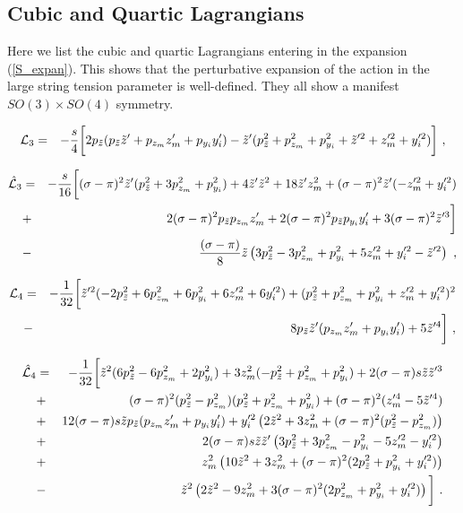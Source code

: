 \documentclass[12pt]{article}
\def\tz{\tilde{z}}
\numberwithin{equation}{section}
\begin{document}
\begin{appendices}
\section{Cubic and Quartic Lagrangians}
\label{Appx_Cubic_Quartic}

Here we list the cubic and quartic Lagrangians entering in the expansion (\ref{S_expan}).  This shows that the perturbative expansion of the action in the large string tension parameter is well-defined.  They all show a manifest $SO(3)\times SO(4)$ symmetry.

\begin{eqnarray}
\notag
\mathcal{L}_3 &=& -\frac{s}{4}\bigg[2 p_{\tz} (p_{\tz}
   \tilde{z}' +p_{z_m} z_m' + p_{y_i} y_i'
   )-\tilde{z}'
   (p_{\tz}^2+p_{z_m}^2+p_{y_i}^2+\tilde{z}'^2 + z_m'^2 + y_i'^2)\bigg] \ , \\
\end{eqnarray}


\begin{eqnarray}
\notag
\hat{\mathcal{L}}_3 &=& -\frac{s}{16}\bigg[ (\sigma-\pi)
   ^2 \tilde{z}' ( p_{\tz}^2+3 p_{z_m}^2 + p_{y_i}^2) +4\tilde{z}' \tilde{z}^2+18 \tilde{z}'z_m^2 +(\sigma-\pi)^2\tilde{z}' (-z_m'^2+y_i'^2)\\
   \notag
   &+&2(\sigma-\pi)^2 p_{\tz}p_{z_m}z_m'
  +2(\sigma-\pi)^2 p_{\tz}p_{y_i}y_i'+3(\sigma-\pi) ^2 \tilde{z}'^3\bigg] \\
 &-&\frac{(\sigma-\pi)}{8} \tilde{z} \left( 3 p_{\tz}^2-3 p_{z_m}^2+ p_{y_i}^2 + 5 z_m'^2 + y_i'^2 - \tilde{z}'^2 \right) \ ,
\end{eqnarray}


\begin{eqnarray}
\notag
\mathcal{L}_4 &=& -\frac{1}{32}\bigg[\tilde{z}'^2 (-2 p_{\tz}^2+6p_{z_m}^2 + 6p_{y_i}^2+6z_m'^2 + 6y_i'^2) +(p_{\tz}^2 + p_{z_m}^2 + p_{y_i}^2+z_m'^2 + y_i'^2)^2\\
   &-&8 p_{\tz}\tilde{z}' (p_{z_m}z_m'+p_{y_i}y_i')+5\tilde{z}'^4 \bigg] \ , 
\end{eqnarray}


\begin{eqnarray}
\notag
\hat{\mathcal{L}}_4 &=&-\frac{1}{32}\bigg[ \tz^2( 6 p_{\tz}^2  - 6 p_{z_m}^2 + 2 p_{y_i}^2) + 3 z_{m}^2 (-p_{\tz}^2 + p_{z_m}^2 + p_{y_i}^2) + 2 (\sigma-\pi) s \tz \tz'^3 \\
\notag
&+& (\sigma-\pi)^2 (p_{\tz}^2 - p_{z_m}^2)(p_{\tz}^2 + p_{z_m}^2 + p_{y_i}^2) + (\sigma-\pi)^2 ( z_m'^4 - 5 \tz'^4) \\
\notag
&+& 12 (\sigma-\pi) s \tz p_{\tz} (p_{z_m} z_m' + p_{y_i} y_i') 
+ y_i'^2 \left(2\tz^2 + 3 z_m^2 + (\sigma-\pi)^2(p_{\tz}^2 - p_{z_m}^2) \right) \\
\notag
&+& 2 (\sigma-\pi) s \tz \tz' \left( 3p_{\tz}^2 + 3p_{z_m}^2 - p_{y_i}^2 - 5 z_m'^2 - y_i'^2\right) \\
\notag
&+& z_m^2 \left(10 \tz^2 + 3 z_m^2 + (\sigma-\pi)^2(2p_{\tz}^2 + p_{y_i}^2 + y_i'^2) \right) \\
&-& \tz^2 \left( 2\tz^2 - 9 z_m^2 + 3 (\sigma-\pi)^2 (2p_{z_m}^2 + p_{y_i}^2 + y_i'^2)\right) \bigg] \ . 
\end{eqnarray}





\end{appendices}
\end{document}
